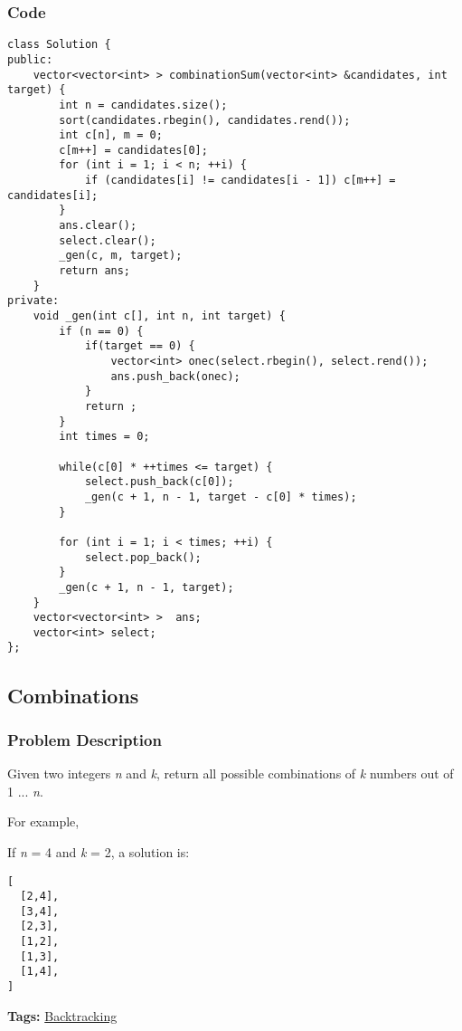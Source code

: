 \documentclass{article}
\begin{document}
\begin{CJK*}{UTF8}{gkai}
\subsubsection*{Code}
\begin{lstlisting}
class Solution {
public:
    vector<vector<int> > combinationSum(vector<int> &candidates, int target) {
        int n = candidates.size();
        sort(candidates.rbegin(), candidates.rend());
        int c[n], m = 0;
        c[m++] = candidates[0];
        for (int i = 1; i < n; ++i) {
            if (candidates[i] != candidates[i - 1]) c[m++] = candidates[i];
        }
        ans.clear();
        select.clear();
        _gen(c, m, target);
        return ans;
    }
private:
    void _gen(int c[], int n, int target) {
        if (n == 0) {
            if(target == 0) {
                vector<int> onec(select.rbegin(), select.rend());
                ans.push_back(onec);
            }
            return ;
        }
        int times = 0;
        
        while(c[0] * ++times <= target) {
            select.push_back(c[0]);
            _gen(c + 1, n - 1, target - c[0] * times);
        }
        
        for (int i = 1; i < times; ++i) {
            select.pop_back();
        }
        _gen(c + 1, n - 1, target);
    }
    vector<vector<int> >  ans;
    vector<int> select;
};

\end{lstlisting}


\subsection{ Combinations }
\label{ Combinations }

\subsubsection*{Problem Description}
Given two integers \emph{n} and \emph{k}, return all possible combinations of \emph{k} numbers out of 1 ... \emph{n}.

For example,


If \emph{n} = 4 and \emph{k} = 2, a solution is:

\begin{verbatim}
[
  [2,4],
  [3,4],
  [2,3],
  [1,2],
  [1,3],
  [1,4],
]
\end{verbatim}

\textbf{Tags: }
\hyperref[ Backtracking ]{ Backtracking }



\end{CJK*}
\end{document}
